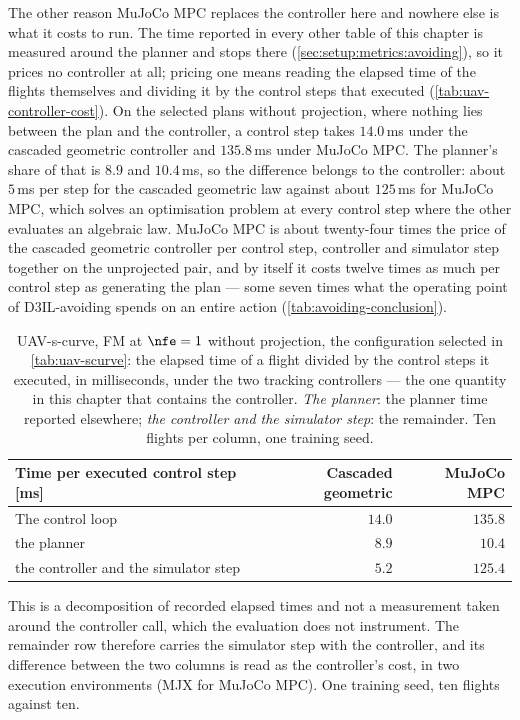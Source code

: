 The other reason MuJoCo MPC replaces the controller here and nowhere else is what it costs to run. The
time reported in every other table of this chapter is measured around the planner and stops there
(\autoref{sec:setup:metrics:avoiding}), so it prices no controller at all; pricing one means reading the
elapsed time of the flights themselves and dividing it by the control steps that executed
(\autoref{tab:uav-controller-cost}). On the selected plans without projection, where nothing lies between
the plan and the controller, a control step takes $14.0$\,ms under the cascaded geometric controller and
$135.8$\,ms under MuJoCo MPC. The planner's share of that is $8.9$ and $10.4$\,ms, so the difference belongs to
the controller: about $5$\,ms per step for the cascaded geometric law against about $125$\,ms for MuJoCo MPC,
which solves an optimisation problem at every control step where the other evaluates an algebraic law. MuJoCo
MPC is about twenty-four times the price of the cascaded geometric controller per control step, controller
and simulator step together on the unprojected pair, and by itself it costs twelve times as much per control
step as generating the plan --- some seven times what the operating
point of D3IL-avoiding spends on an entire action (\autoref{tab:avoiding-conclusion}).

\begin{table}[htpb]
  \caption[UAV-s-curve: what each tracking controller costs per control step]{UAV-s-curve, FM at
  $\nfe=1$ without projection, the configuration selected in \autoref{tab:uav-scurve}: the elapsed time of a
  flight divided by the control steps it executed, in milliseconds, under the two tracking controllers ---
  the one quantity in this chapter that contains the controller. \emph{The planner}: the planner time reported
  elsewhere; \emph{the controller and the simulator step}: the remainder. Ten flights per column, one training
  seed.}
  \label{tab:uav-controller-cost}
  \centering
  \small
  \begin{tabularx}{\linewidth}{@{}L r r@{}}
    \toprule
    Time per executed control step [ms] & Cascaded geometric & MuJoCo MPC \\
    \midrule
    The control loop                          & $14.0$ & $135.8$ \\
    \quad the planner                         & $8.9$ & $10.4$ \\
    \quad the controller and the simulator step & $5.2$ & $125.4$ \\
    \bottomrule
  \end{tabularx}
\end{table}
This is a decomposition of recorded elapsed times and not a measurement taken around the
controller call, which the evaluation does not instrument. The remainder row therefore carries the
simulator step with the controller, and its difference between the two columns is read as the controller's
cost, in two execution environments (MJX for MuJoCo MPC). One training seed, ten flights against ten.

